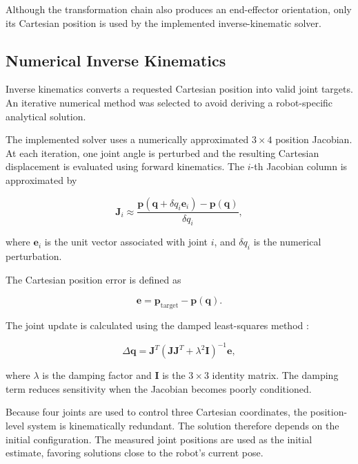 Although the transformation chain also produces an end-effector orientation, only its Cartesian position is used by the implemented inverse-kinematic solver.

\subsection{Numerical Inverse Kinematics}

Inverse kinematics converts a requested Cartesian position into valid joint targets. An iterative numerical method was selected to avoid deriving a robot-specific analytical solution.

The implemented solver uses a numerically approximated \(3 \times 4\) position Jacobian. At each iteration, one joint angle is perturbed and the resulting Cartesian displacement is evaluated using forward kinematics. The \(i\)-th Jacobian column is approximated by

\begin{equation}
    \mathbf{J}_{i} \approx
    \frac{
        \mathbf{p}
        \left(
            \mathbf{q} + \delta q_i \mathbf{e}_i
        \right)
        -
        \mathbf{p}(\mathbf{q})
    }{
        \delta q_i
    },
    \label{eq:numerical_jacobian}
\end{equation}

where \(\mathbf{e}_i\) is the unit vector associated with joint \(i\), and \(\delta q_i\) is the numerical perturbation.

The Cartesian position error is defined as

\begin{equation}
    \mathbf{e} =
    \mathbf{p}_{\mathrm{target}}
    -
    \mathbf{p}(\mathbf{q}).
    \label{eq:cartesian_error}
\end{equation}

The joint update is calculated using the damped least-squares method \cite{damped_least_squares}:

\begin{equation}
    \Delta \mathbf{q} =
    \mathbf{J}^{T}
    \left(
        \mathbf{J}\mathbf{J}^{T}
        +
        \lambda^{2}\mathbf{I}
    \right)^{-1}
    \mathbf{e},
    \label{eq:damped_least_squares}
\end{equation}

where \(\lambda\) is the damping factor and \(\mathbf{I}\) is the \(3 \times 3\) identity matrix. The damping term reduces sensitivity when the Jacobian becomes poorly conditioned.

Because four joints are used to control three Cartesian coordinates, the position-level system is kinematically redundant. The solution therefore depends on the initial configuration. The measured joint positions are used as the initial estimate, favoring solutions close to the robot's current pose.

